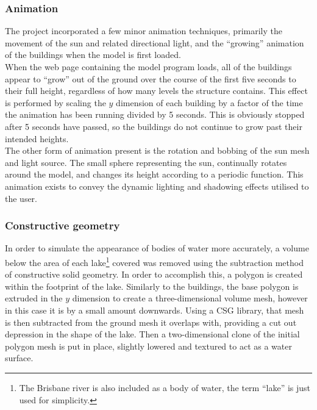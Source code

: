
        \subsubsection{Animation} %
        \label{ssub:animation}
            The project incorporated a few minor animation techniques, primarily the movement of the sun and related directional light, and the ``growing'' animation of the buildings when the model is first loaded.\\

            When the web page containing the model program loads, all of the buildings appear to ``grow'' out of the ground over the course of the first five seconds to their full height, regardless of how many levels the structure contains.
            This effect is performed by scaling the $y$ dimension of each building by a factor of the time the animation has been running divided by 5 seconds.
            This is obviously stopped after 5 seconds have passed, so the buildings do not continue to grow past their intended heights.\\

            The other form of animation present is the rotation and bobbing of the sun mesh and light source.
            The small sphere representing the sun, continually rotates around the model, and changes its height according to a periodic function.
            This animation exists to convey the dynamic lighting and shadowing effects utilised to the user.

        \subsubsection{Constructive geometry} %
        \label{ssub:constructive_geometry}
            In order to simulate the appearance of bodies of water more accurately, a volume below the area of each lake\footnote{The Brisbane river is also included as a body of water, the term ``lake'' is just used for simplicity.} covered was removed using the subtraction method of constructive solid geometry.
            In order to accomplish this, a polygon is created within the footprint of the lake.
            Similarly to the buildings, the base polygon is extruded in the $y$ dimension to create a three-dimensional volume mesh, however in this case it is by a small amount downwards.
            Using a CSG library, that mesh is then subtracted from the ground mesh it overlaps with, providing a cut out depression in the shape of the lake.
            Then a two-dimensional clone of the initial polygon mesh is put in place, slightly lowered and textured to act as a water surface.

